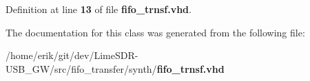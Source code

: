 Definition at line {\bf 13} of file {\bf fifo\+\_\+trnsf.\+vhd}.



The documentation for this class was generated from the following file\+:\begin{DoxyCompactItemize}
\item 
/home/erik/git/dev/\+Lime\+S\+D\+R-\/\+U\+S\+B\+\_\+\+G\+W/src/fifo\+\_\+transfer/synth/{\bf fifo\+\_\+trnsf.\+vhd}\end{DoxyCompactItemize}
